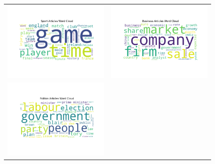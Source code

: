 \documentclass[12pt]{article}
\begin{document}
\begin{figure}[H]
  \centering
  \begin{tabular}{cc}
    \includegraphics[scale=0.50]{plots/sport_wordcloud.png}    &
    \includegraphics[scale=0.50]{plots/business_wordcloud.png}      \\
    \includegraphics[scale=0.50]{plots/politics_wordcloud.png} &

\end{tabular}
\end{figure}
\end{document}
